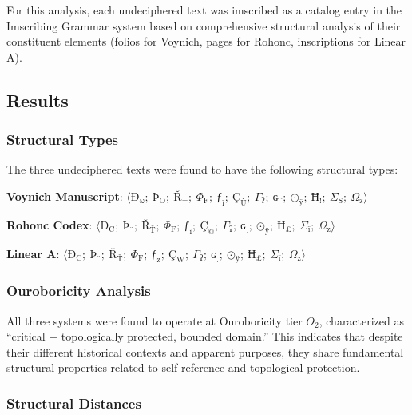 \documentclass[12pt,a4paper]{article}
\begin{document}
For this analysis, each undeciphered text was imscribed as a catalog entry in the Imscribing Grammar system based on comprehensive structural analysis of their constituent elements (folios for Voynich, pages for Rohonc, inscriptions for Linear A).

\subsection{Results}

\subsubsection{Structural Types}

The three undeciphered texts were found to have the following structural types:

\textbf{Voynich Manuscript}: $\langle \text{Ð}_{\text{ω}};\ \text{Þ}_{\text{O}};\ \text{Ř}_{\text{=}};\ \Phi_{\text{F}};\ \text{ƒ}_{\text{ì}};\ \text{Ç}_{\text{Ù}};\ \Gamma_{\text{ʔ}};\ \text{ɢ}_{\text{\textasciicircum}};\ \text{⊙}_{\text{ÿ}};\ \text{Ħ}_{\text{!}};\ \Sigma_{\text{S}};\ \Omega_{\text{z}} \rangle$

\textbf{Rohonc Codex}: $\langle \text{Ð}_{\text{C}};\ \text{Þ}_{\text{¨}};\ \text{Ř}_{\text{Ť}};\ \Phi_{\text{F}};\ \text{ƒ}_{\text{ì}};\ \text{Ç}_{\text{@}};\ \Gamma_{\text{ʔ}};\ \text{ɢ}_{\text{ˌ}};\ \text{⊙}_{\text{ÿ}};\ \text{Ħ}_{\text{£}};\ \Sigma_{\text{ï}};\ \Omega_{\text{z}} \rangle$

\textbf{Linear A}: $\langle \text{Ð}_{\text{C}};\ \text{Þ}_{\text{¨}};\ \text{Ř}_{\text{Ť}};\ \Phi_{\text{F}};\ \text{ƒ}_{\text{ż}};\ \text{Ç}_{\text{W}};\ \Gamma_{\text{ʔ}};\ \text{ɢ}_{\text{ˌ}};\ \text{⊙}_{\text{ÿ}};\ \text{Ħ}_{\text{£}};\ \Sigma_{\text{ï}};\ \Omega_{\text{z}} \rangle$

\subsubsection{Ouroboricity Analysis}

All three systems were found to operate at Ouroboricity tier $O_2$, characterized as ``critical + topologically protected, bounded domain.'' This indicates that despite their different historical contexts and apparent purposes, they share fundamental structural properties related to self-reference and topological protection.

\subsubsection{Structural Distances}
\end{document}
